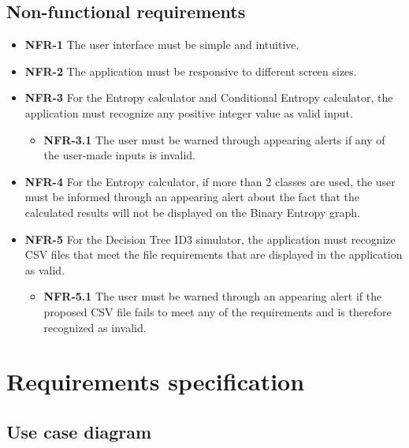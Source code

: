 \subsection{Non-functional requirements}
\begin{itemize}
    \item \textbf{NFR-1} The user interface must be simple and intuitive.
    \item \textbf{NFR-2} The application must be responsive to different screen sizes.
    \item \textbf{NFR-3} For the Entropy calculator and Conditional Entropy calculator, the application must recognize any positive integer value as valid input.
    \begin{itemize}
        \item \textbf{NFR-3.1} The user must be warned through appearing alerts if any of the user-made inputs is invalid.
    \end{itemize}
    \item \textbf{NFR-4} For the Entropy calculator, if more than 2 classes are used, the user must be informed through an appearing alert about the fact that the calculated results will not be displayed on the Binary Entropy graph.
    \item \textbf{NFR-5} For the Decision Tree ID3 simulator, the application must recognize CSV files that meet the file requirements that are displayed in the application as valid.
    \begin{itemize}
        \item \textbf{NFR-5.1} The user must be warned through an appearing alert if the proposed CSV file fails to meet any of the requirements and is therefore recognized as invalid.
    \end{itemize}
\end{itemize}

\section{Requirements specification}
\subsection{Use case diagram}

